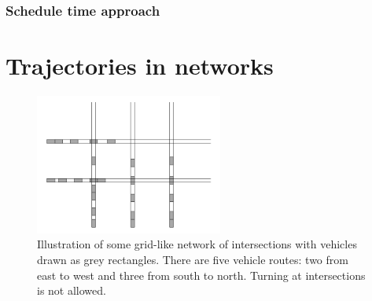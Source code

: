 \documentclass[a4paper]{article}
\theoremstyle{definition}
\theoremstyle{plain}
\begin{document}

\subsubsection{Schedule time approach}

\newpage
\section{Trajectories in networks}

\begin{figure}
  \centering
  \includegraphics[width=0.55\textwidth]{figures/network/grid_example.png}
  \caption{Illustration of some grid-like network of intersections with vehicles
    drawn as grey rectangles. There are five vehicle routes: two from east to
    west and three from south to north. Turning at intersections is not
    allowed.}\label{fig:network_illustration}
\end{figure}
\end{document}
